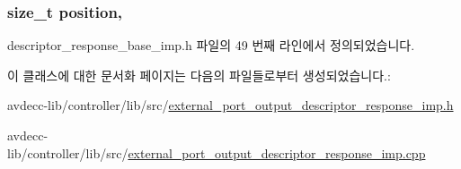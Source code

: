 \subsubsection[{\texorpdfstring{position}{position}}]{\setlength{\rightskip}{0pt plus 5cm}size\+\_\+t position\hspace{0.3cm}{\ttfamily [protected]}, {\ttfamily [inherited]}}\hypertarget{classavdecc__lib_1_1descriptor__response__base__imp_a7a04afe5347934be732ec70a70bd0a28}{}\label{classavdecc__lib_1_1descriptor__response__base__imp_a7a04afe5347934be732ec70a70bd0a28}


descriptor\+\_\+response\+\_\+base\+\_\+imp.\+h 파일의 49 번째 라인에서 정의되었습니다.



이 클래스에 대한 문서화 페이지는 다음의 파일들로부터 생성되었습니다.\+:\begin{DoxyCompactItemize}
\item 
avdecc-\/lib/controller/lib/src/\hyperlink{external__port__output__descriptor__response__imp_8h}{external\+\_\+port\+\_\+output\+\_\+descriptor\+\_\+response\+\_\+imp.\+h}\item 
avdecc-\/lib/controller/lib/src/\hyperlink{external__port__output__descriptor__response__imp_8cpp}{external\+\_\+port\+\_\+output\+\_\+descriptor\+\_\+response\+\_\+imp.\+cpp}\end{DoxyCompactItemize}
